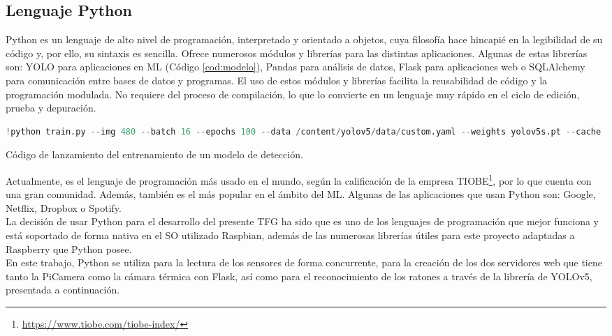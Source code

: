 \subsection{Lenguaje Python}
\label{sec:python}
Python es un lenguaje de alto nivel de programación, interpretado y orientado a objetos, cuya filosofía hace hincapié en la legibilidad de su código y, por ello, su sintaxis es sencilla. Ofrece numerosos módulos y librerías para las distintas aplicaciones. Algunas de estas librerías son: YOLO para aplicaciones en ML (Código \ref{cod:modelo}), Pandas para análisis de datos, Flask para aplicaciones web o SQLAlchemy para comunicación entre bases de datos y programas. El uso de estos módulos y librerías facilita la reusabilidad de código y la programación modulada. No requiere del proceso de compilación, lo que lo convierte en un lenguaje muy rápido en el ciclo de edición, prueba y depuración.\\
\begin{code}[h]
\begin{lstlisting}[language=Python]
!python train.py --img 480 --batch 16 --epochs 100 --data /content/yolov5/data/custom.yaml --weights yolov5s.pt --cache
\end{lstlisting}
\caption[Código de lanzamiento del entrenamiento de un modelo de detección.]{Código de lanzamiento del entrenamiento de un modelo de detección.}
\label{cod:modelo}
\end{code}

Actualmente, es el lenguaje de programación más usado en el mundo, según la calificación de la empresa TIOBE\footnote{\url{https://www.tiobe.com/tiobe-index/}}, por lo que cuenta con una gran comunidad. Además, también es el más popular en el ámbito del ML. Algunas de las aplicaciones que usan Python son: Google, Netflix, Dropbox o Spotify.\\

La decisión de usar Python para el desarrollo del presente TFG ha sido que es uno de los lenguajes de programación que mejor funciona y está soportado de forma nativa en el SO utilizado Raspbian, además de las numerosas librerías útiles para este proyecto adaptadas a Raspberry que Python posee.\\

En este trabajo, Python se utiliza para la lectura de los sensores de forma concurrente, para la creación de los dos servidores web que tiene tanto la PiCamera como la cámara térmica con Flask, así como para el reconocimiento de los ratones a través de la librería de YOLOv5, presentada a continuación.\\

